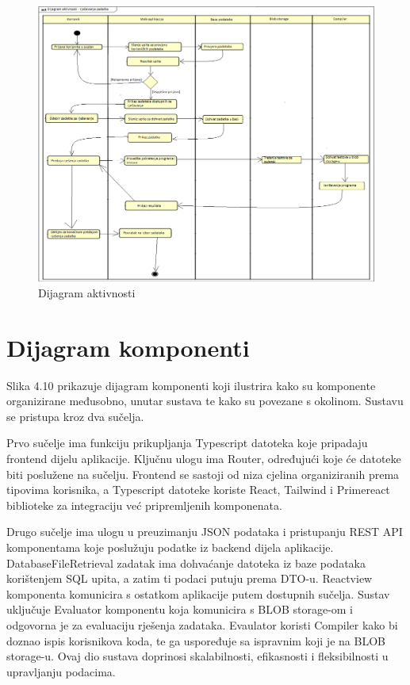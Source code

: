 			\begin{figure}[H]
				\includegraphics[width=\linewidth]{slike/DijagramAktivnosti.png}
				\centering
				\caption{Dijagram aktivnosti}
				\label{fig:aktivnost}
			\end{figure}
			\eject
		\section{Dijagram komponenti}
		
		
			Slika 4.10 prikazuje dijagram komponenti koji ilustrira kako su komponente organizirane međusobno, unutar sustava te kako su povezane s okolinom. Sustavu se pristupa kroz dva sučelja. 
			
			Prvo sučelje ima funkciju prikupljanja Typescript datoteka koje pripadaju frontend dijelu aplikacije. Ključnu ulogu ima Router, određujući koje će datoteke biti poslužene na sučelju. Frontend se sastoji od niza cjelina organiziranih prema tipovima korisnika, a Typescript datoteke koriste React, Tailwind i Primereact biblioteke za integraciju već pripremljenih komponenata.
			
			Drugo sučelje ima ulogu u preuzimanju JSON podataka i pristupanju REST API komponentama koje poslužuju podatke iz backend dijela aplikacije. DatabaseFileRetrieval zadatak ima dohvaćanje datoteka iz baze podataka korištenjem SQL upita, a zatim ti podaci putuju prema DTO-u. Reactview komponenta komunicira s ostatkom aplikacije putem dostupnih sučelja. Sustav uključuje Evaluator komponentu koja komunicira s BLOB storage-om i odgovorna je za evaluaciju rješenja zadataka. Evaulator koristi Compiler kako bi doznao ispis korisnikova koda, te ga uspoređuje sa ispravnim koji je na BLOB storage-u. Ovaj dio sustava doprinosi skalabilnosti, efikasnosti i fleksibilnosti u upravljanju podacima.
			 
